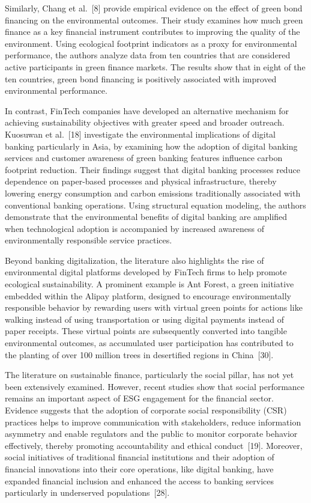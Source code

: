 \documentclass[12pt]{article}
\begin{document}
Similarly, Chang et al.~[8] provide empirical evidence on the effect of green bond financing on the environmental outcomes. Their study examines how much green finance as a key financial instrument contributes to improving the quality of the environment. Using ecological footprint indicators as a proxy for environmental performance, the authors analyze data from ten countries that are considered active participants in green finance markets. The results show that in eight of the ten countries, green bond financing is positively associated with improved environmental performance.

In contrast, FinTech companies have developed an alternative mechanism for achieving sustainability objectives with greater speed and broader outreach. Kuosuwan et al.~[18] investigate the environmental implications of digital banking particularly in Asia, by examining how the adoption of digital banking services and customer awareness of green banking features influence carbon footprint reduction. Their findings suggest that digital banking processes reduce dependence on paper-based processes and physical infrastructure, thereby lowering energy consumption and carbon emissions traditionally associated with conventional banking operations. Using structural equation modeling, the authors demonstrate that the environmental benefits of digital banking are amplified when technological adoption is accompanied by increased awareness of environmentally responsible service practices.

Beyond banking digitalization, the literature also highlights the rise of environmental digital platforms developed by FinTech firms to help promote ecological sustainability. A prominent example is Ant Forest, a green initiative embedded within the Alipay platform, designed to encourage environmentally responsible behavior by rewarding users with virtual green points for actions like walking instead of using transportation or using digital payments instead of paper receipts. These virtual points are subsequently converted into tangible environmental outcomes, as accumulated user participation has contributed to the planting of over 100 million trees in desertified regions in China~[30].

The literature on sustainable finance, particularly the social pillar, has not yet been extensively examined. However, recent studies show that social performance remains an important aspect of ESG engagement for the financial sector. Evidence suggests that the adoption of corporate social responsibility (CSR) practices helps to improve communication with stakeholders, reduce information asymmetry and enable regulators and the public to monitor corporate behavior effectively, thereby promoting accountability and ethical conduct~[19]. Moreover, social initiatives of traditional financial institutions and their adoption of financial innovations into their core operations, like digital banking, have expanded financial inclusion and enhanced the access to banking services particularly in underserved populations~[28].
\end{document}
